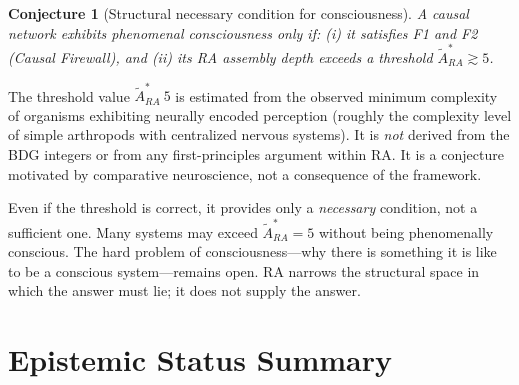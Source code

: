 \documentclass[11pt]{article}
\def\mathrm#1{#1}%
\def\approx{~}%
\newtheorem{conjecture}{Conjecture}
\begin{document}
\begin{conjecture}[Structural necessary condition for consciousness]
\label{conj:consciousness}
A causal network exhibits phenomenal consciousness only if: (i) it satisfies F1 and F2 (Causal Firewall), and (ii) its RA assembly depth exceeds a threshold $\tilde{A}_{\mathrm{RA}}^* \gtrsim 5$.
\end{conjecture}

The threshold value $\tilde{A}_{\mathrm{RA}}^* \approx 5$ is estimated from the observed minimum complexity of organisms exhibiting neurally encoded perception (roughly the complexity level of simple arthropods with centralized nervous systems). It is \emph{not} derived from the BDG integers or from any first-principles argument within RA. It is a conjecture motivated by comparative neuroscience, not a consequence of the framework.

Even if the threshold is correct, it provides only a \emph{necessary} condition, not a sufficient one. Many systems may exceed $\tilde{A}_{\mathrm{RA}}^* = 5$ without being phenomenally conscious. The hard problem of consciousness---why there is something it is like to be a conscious system---remains open. RA narrows the structural space in which the answer must lie; it does not supply the answer.

\section{Epistemic Status Summary}
\label{sec:status}
\end{document}
